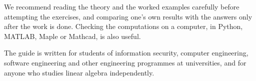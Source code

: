 We recommend reading the theory and the worked examples carefully before
attempting the exercises, and comparing one’s own results with the answers
only after the work is done. Checking the computations on a computer, in
Python, MATLAB, Maple or Mathcad, is also useful.

The guide is written for students of information security, computer
engineering, software engineering and other engineering programmes at
universities, and for anyone who studies linear algebra independently.
